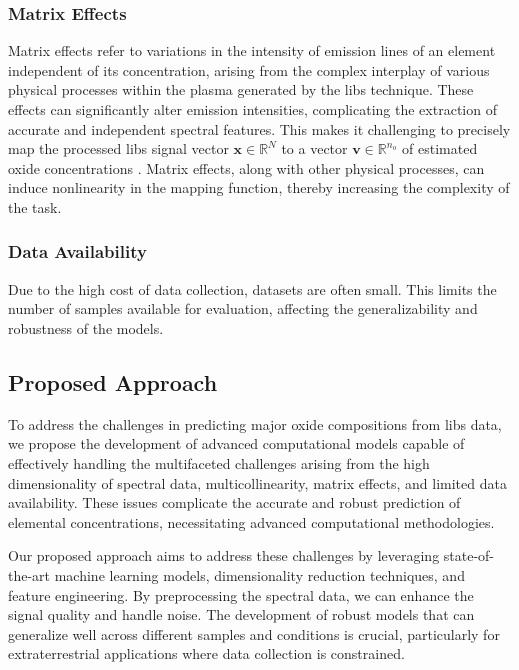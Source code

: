 \subsubsection{Matrix Effects}
Matrix effects refer to variations in the intensity of emission lines of an element independent of its concentration, arising from the complex interplay of various physical processes within the plasma generated by the \gls{libs} technique. These effects can significantly alter emission intensities, complicating the extraction of accurate and independent spectral features. This makes it challenging to precisely map the processed \gls{libs} signal vector $\mathbf{x} \in \mathbb{R}^N$ to a vector $\mathbf{v} \in \mathbb{R}^{n_o}$ of estimated oxide concentrations \cite{cleggRecalibrationMarsScience2017, andersonImprovedAccuracyQuantitative2017}.
Matrix effects, along with other physical processes, can induce nonlinearity in the mapping function, thereby increasing the complexity of the task\cite{liuRecentAdvancesMachine2024}.

\subsubsection{Data Availability}
Due to the high cost of data collection, datasets are often small. This limits the number of samples available for evaluation, affecting the generalizability and robustness of the models\cite{p9_paper}.

\subsection{Proposed Approach}
To address the challenges in predicting major oxide compositions from \gls{libs} data, we propose the development of advanced computational models capable of effectively handling the multifaceted challenges arising from the high dimensionality of spectral data, multicollinearity, matrix effects, and limited data availability.
These issues complicate the accurate and robust prediction of elemental concentrations, necessitating advanced computational methodologies. 

Our proposed approach aims to address these challenges by leveraging state-of-the-art machine learning models, dimensionality reduction techniques, and feature engineering.
By preprocessing the spectral data, we can enhance the signal quality and handle noise.
The development of robust models that can generalize well across different samples and conditions is crucial, particularly for extraterrestrial applications where data collection is constrained.

